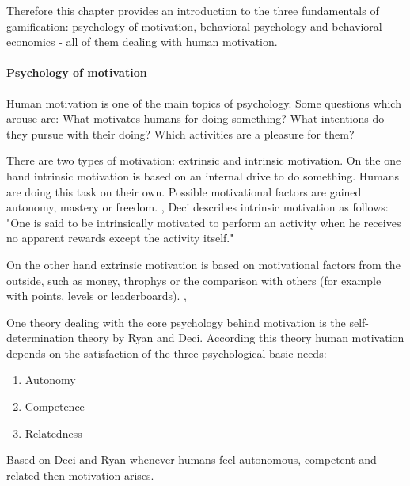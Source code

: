 Therefore this chapter provides an introduction to the three fundamentals of gamification: psychology of motivation, behavioral psychology and behavioral economics - all of them dealing with human motivation.

\paragraph*{Psychology of motivation}
Human motivation is one of the main topics of psychology. Some questions which arouse are: What motivates humans for doing something? What intentions do they pursue with their doing? Which activities are a pleasure for them? \cite[p. 1]{bierhoffeditorEnzyklopaediePsychologieSoziale2016}

There are two types of motivation: extrinsic and intrinsic motivation. 
On the one hand intrinsic motivation is based on an internal drive to do something. Humans are doing this task on their own. Possible motivational factors are gained autonomy, mastery or freedom. \cite[p. 2, 3, 4]{bierhoffeditorEnzyklopaediePsychologieSoziale2016}, \cite[p. 60, 61]{kumarGamificationWorkDesigning2013} Deci describes intrinsic motivation as follows: "One is said to be intrinsically motivated to perform an activity when he receives no apparent rewards except the activity itself." \cite[p. 105]{deciEffectsExternallyMediated1971}

On the other hand extrinsic motivation is based on motivational factors from the outside, such as money, throphys or the comparison with others (for example with points, levels or leaderboards). \cite[p. 2, 3, 4]{bierhoffeditorEnzyklopaediePsychologieSoziale2016}, \cite[p. 60, 61]{kumarGamificationWorkDesigning2013}

\label{selfDeterminationTheory}
One theory dealing with the core psychology behind motivation is the self-determination theory by Ryan and Deci. According this theory human motivation depends on the satisfaction of the three psychological basic needs: 
\begin{enumerate}
	\item Autonomy
	\item Competence
	\item Relatedness
\end{enumerate} 
Based on Deci and Ryan whenever humans feel autonomous, competent and related then motivation arises. \cite[p. 416-432]{deciTheoriesSocialPsychology2019}

